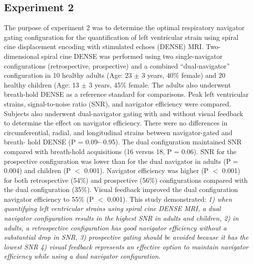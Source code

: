 \subsection{Experiment 2}
	The purpose of experiment 2 was to determine the optimal respiratory navigator gating configuration for the quantification of left ventricular strain using spiral cine displacement encoding with stimulated echoes (DENSE) MRI. Two-dimensional spiral cine DENSE was performed using two single-navigator configurations (retrospective, prospective) and a combined “dual-navigator” configuration in 10 healthy adults (Age: 23 $\pm$ 3 years, 40\% female) and 20 healthy children  (Age: 13 $\pm$ 3 years, 45\% female. The adults also underwent breath-hold DENSE as a reference standard for comparisons. Peak left ventricular strains, signal-to-noise ratio (SNR), and navigator efficiency were compared. Subjects also underwent dual-navigator gating with and without visual feedback to determine the effect on navigator efficiency. There were no differences in circumferential, radial, and longitudinal strains between navigator-gated and breath- hold DENSE (P = 0.09-–0.95). The dual configuration maintained SNR compared with breath-hold acquisitions (16 versus 18, P = 0.06). SNR for the prospective configuration was lower than for the dual navigator in adults (P = 0.004) and children (P $<$ 0.001). Navigator efficiency was higher (P $<$ 0.001) for both retrospective (54\%) and prospective (56\%) configurations compared with the dual configuration (35\%). Visual feedback improved the dual configuration navigator efficiency to 55\% (P $<$ 0.001). This study demonstrated: \textit{1) when quantifying left ventricular strains using spiral cine DENSE MRI, a dual navigator configuration results in the highest SNR in adults and children, 2) in adults, a retrospective configuration has good navigator efficiency without a substantial drop in SNR, 3) prospective gating should be avoided because it has the lowest SNR 4) visual feedback represents an effective option to maintain navigator efficiency while using a dual navigator configuration.}
	
